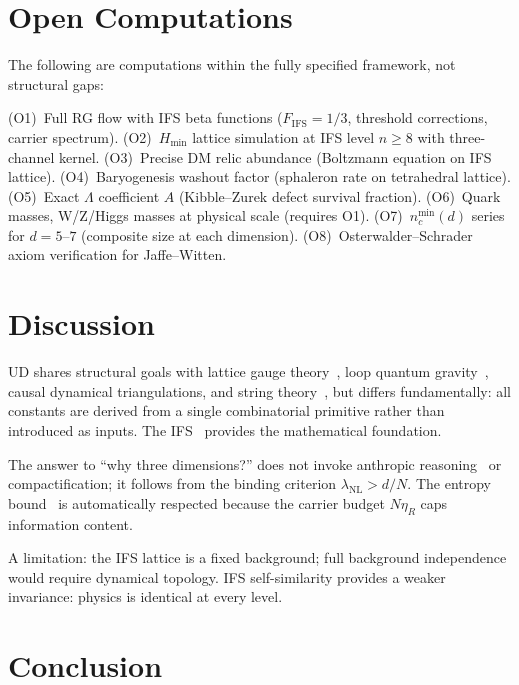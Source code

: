 \documentclass[11pt,twocolumn]{article}
\begin{document}
\section{Open Computations}
\label{sec:open}

The following are computations within the fully specified framework, not structural gaps:

(O1)~Full RG flow with IFS beta functions ($F_{\mathrm{IFS}}=1/3$, threshold corrections, carrier spectrum).
(O2)~$H_{\min}$ lattice simulation at IFS level $n\geq 8$ with three-channel kernel.
(O3)~Precise DM relic abundance (Boltzmann equation on IFS lattice).
(O4)~Baryogenesis washout factor (sphaleron rate on tetrahedral lattice).
(O5)~Exact $\Lambda$ coefficient $A$ (Kibble--Zurek defect survival fraction).
(O6)~Quark masses, W/Z/Higgs masses at physical scale (requires O1).
(O7)~$n_c^{\min}(d)$ series for $d=5$--$7$ (composite size at each dimension).
(O8)~Osterwalder--Schrader axiom verification for Jaffe--Witten.

\section{Discussion}
\label{sec:discussion}

UD shares structural goals with lattice gauge theory~\cite{wilson1974}, loop quantum gravity~\cite{rovelli2004}, causal dynamical triangulations, and string theory~\cite{polyakov1987}, but differs fundamentally: all constants are derived from a single combinatorial primitive rather than introduced as inputs.
The IFS~\cite{hutchinson1981,falconer2003} provides the mathematical foundation.

The answer to ``why three dimensions?'' does not invoke anthropic reasoning~\cite{weinberg1987} or compactification; it follows from the binding criterion $\lambda_{\mathrm{NL}}>d/N$.
The entropy bound~\cite{bekenstein1973} is automatically respected because the carrier budget $N\eta_R$ caps information content.

A limitation: the IFS lattice is a fixed background; full background independence would require dynamical topology.
IFS self-similarity provides a weaker invariance: physics is identical at every level.

\section{Conclusion}
\label{sec:conclusion}
\end{document}
